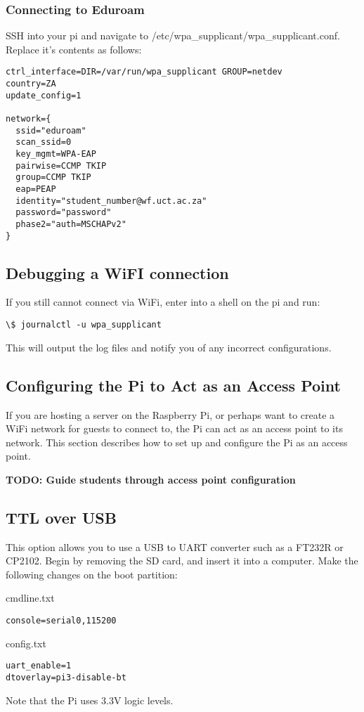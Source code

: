 \subsubsection{Connecting to Eduroam}
SSH into your pi and navigate to /etc/wpa\_supplicant/wpa\_supplicant.conf. Replace it's contents as follows:

\begin{verbatim}
ctrl_interface=DIR=/var/run/wpa_supplicant GROUP=netdev
country=ZA
update_config=1

network={
  ssid="eduroam"
  scan_ssid=0
  key_mgmt=WPA-EAP
  pairwise=CCMP TKIP
  group=CCMP TKIP
  eap=PEAP
  identity="student_number@wf.uct.ac.za"
  password="password"
  phase2="auth=MSCHAPv2"              
}  
\end{verbatim}

\subsection{Debugging a WiFI connection}
If you still cannot connect via WiFi, enter into a shell on the pi and run:
\begin{verbatim}
\$ journalctl -u wpa_supplicant
\end{verbatim}

This will output the log files and notify you of any incorrect configurations.

\subsection{Configuring the Pi to Act as an Access Point}
If you are hosting a server on the Raspberry Pi, or perhaps want to create a WiFi network for guests to connect to, the Pi can act as an access point to its network. This section describes how to set up and configure the Pi as an access point.

\textbf{TODO: Guide students through access point configuration}

\subsection{TTL over USB}
This option allows you to use a USB to UART converter such as a FT232R or CP2102.
Begin by removing the SD card, and insert it into a computer. Make the following changes on the boot partition:

cmdline.txt
\begin{verbatim}
console=serial0,115200 
\end{verbatim}


config.txt
\begin{verbatim}
uart_enable=1
dtoverlay=pi3-disable-bt
\end{verbatim}

Note that the Pi uses 3.3V logic levels. 

